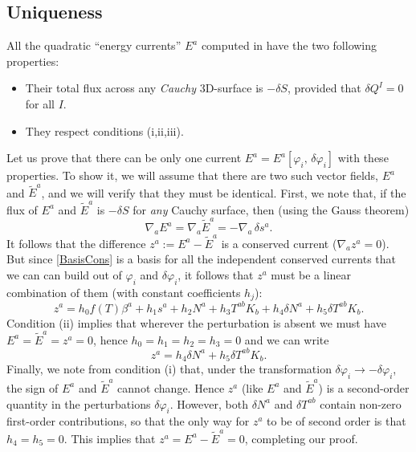 \documentclass[aps,prl,reprint,nofootinbib]{revtex4-1}
\begin{document}
\subsection{Uniqueness}


All the quadratic ``energy currents'' $E^a$ computed in \cite{GavassinoGibbs2021} have the two following properties:
\begin{itemize}
\item Their total flux across any \textit{Cauchy} 3D-surface is $-\delta S$, provided that $\delta Q^I=0$ for all $I$.
\item They respect conditions (i,ii,iii). 
\end{itemize} 
Let us prove that there can be only one current $E^a=E^a[\varphi_i, \, \delta \varphi_i]$ with these properties. 
To show it, we will assume that there are two such vector fields, $E^a$ and $\tilde{E}^a$, and we will verify that they must be identical.
First, we note that, if the flux of $E^a$ and $\tilde{E}^a$ is $-\delta S$ for \textit{any} Cauchy surface, then (using the Gauss theorem)
\begin{equation}\label{Eaaa}
\nabla_a E^a = \nabla_a \tilde{E}^a =-\nabla_a \, \delta s^a.
\end{equation}
It follows that the difference $z^a :=E^a -\tilde{E}^a$ is a conserved current ($\nabla_a z^a=0$). But since \eqref{BasisCons} is a basis for all the independent conserved currents that we can can build out of $\varphi_i$ and $\delta \varphi_i$, it follows that $z^a$ must be a linear combination of them (with constant coefficients $h_j$):
\begin{equation}
z^a = h_0 f(T) \beta^a +  h_1 s^a +h_2 N^a +h_3 T^{ab} K_b + h_4 \delta N^a + h_5 \delta T^{ab} K_b.
\end{equation}
Condition (ii) implies that wherever the perturbation is absent we must have $E^a=\tilde{E}^a=z^a=0$, hence $h_0 =h_1 = h_2 = h_3 =0$ and we can write
\begin{equation}
z^a =  h_4 \delta N^a + h_5 \delta T^{ab} K_b.
\end{equation}
Finally, we note from condition (i) that, under the transformation $\delta \varphi_i \rightarrow -\delta \varphi_i$, the sign of $E^a$ and $\tilde{E}^a$ cannot change. Hence $z^a$ (like $E^a$ and $\tilde{E}^a$) is a second-order quantity in the perturbations $\delta \varphi_i$. However, both $\delta N^a$ and $\delta T^{ab}$ contain non-zero first-order contributions, so that the only way for $z^a$ to be of second order is that $h_4=h_5=0$. This implies that $z^a=E^a-\tilde{E}^a=0$, completing our proof. 
\end{document}
